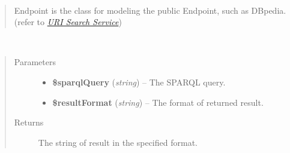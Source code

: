 \documentclass[letterpaper,10pt,english]{sphinxmanual}
\begin{document}
\begin{fulllineitems}
\label{docs/api:Endpoint}~\begin{quote}

Endpoint is the class for modeling the public Endpoint, such as DBpedia. (refer to {\hyperref[docs/uss:uss]{\emph{URI Search Service}}})
\end{quote}

\begin{fulllineitems}
\label{docs/api:Endpoint::issueSparqlQuery}~\begin{quote}\begin{description}
\item[{Parameters}] \leavevmode\begin{itemize}
\item {} 
\textbf{\$sparqlQuery} (\emph{string}) -- The SPARQL query.

\item {} 
\textbf{\$resultFormat} (\emph{string}) -- The format of returned result.

\end{itemize}

\item[{Returns}] \leavevmode
The string of result in the specified format.

\end{description}\end{quote}

\end{fulllineitems}


\end{fulllineitems}

\end{document}
